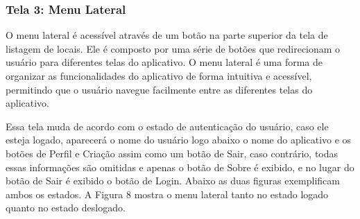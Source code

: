     \FloatBarrier

\subsubsection{Tela 3: Menu Lateral}

    O menu lateral é acessível através de um botão na parte superior da tela de listagem de locais. Ele é composto por uma série de botões que redirecionam o usuário para diferentes telas do aplicativo. O menu lateral é uma forma de organizar as funcionalidades do aplicativo de forma intuitiva e acessível, permitindo que o usuário navegue facilmente entre as diferentes telas do aplicativo.

    Essa tela muda de acordo com o estado de autenticação do usuário, caso ele esteja logado, aparecerá o nome do usuário logo abaixo o nome do aplicativo e os botões de Perfil e Criação assim como um botão de Sair, caso contrário, todas essas informações são omitidas e apenas o botão de Sobre é exibido, e no lugar do botão de Sair é exibido o botão de Login. Abaixo as duas figuras exemplificam ambos os estados. A Figura 8 mostra o menu lateral tanto no estado logado quanto no estado deslogado.

